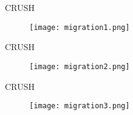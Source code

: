 
\begin{frame}{CRUSH}
    \begin{figure}[htpb]
        \centering
        \texttt{[image: migration1.png]}
    \end{figure}
\end{frame}

\begin{frame}{CRUSH}
    \begin{figure}[htpb]
        \centering
        \texttt{[image: migration2.png]}
    \end{figure}
\end{frame}

\begin{frame}{CRUSH}
    \begin{figure}[htpb]
        \centering
        \texttt{[image: migration3.png]}
    \end{figure}
\end{frame}

